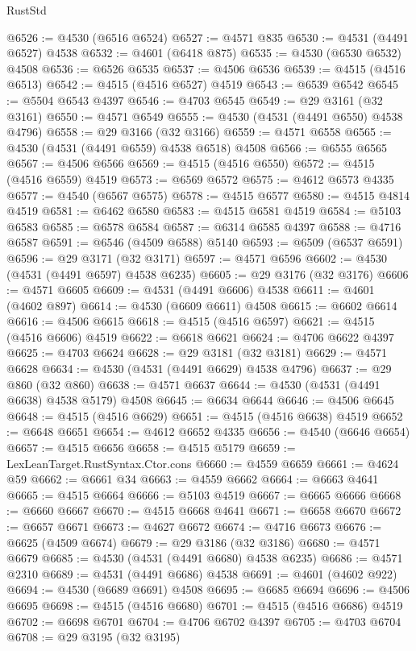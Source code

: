 \begin{lexlean}{RustStd}
\begin{coremodule}
@6526 := @4530 (@6516 @6524)
@6527 := @4571 @835
@6530 := @4531 (@4491 @6527) @4538
@6532 := @4601 (@6418 @875)
@6535 := @4530 (@6530 @6532) @4508
@6536 := @6526 @6535
@6537 := @4506 @6536
@6539 := @4515 (@4516 @6513)
@6542 := @4515 (@4516 @6527) @4519
@6543 := @6539 @6542
@6545 := @5504 @6543 @4397
@6546 := @4703 @6545
@6549 := @29 @3161 (@32 @3161)
@6550 := @4571 @6549
@6555 := @4530 (@4531 (@4491 @6550) @4538 @4796)
@6558 := @29 @3166 (@32 @3166)
@6559 := @4571 @6558
@6565 := @4530 (@4531 (@4491 @6559) @4538 @6518) @4508
@6566 := @6555 @6565
@6567 := @4506 @6566
@6569 := @4515 (@4516 @6550)
@6572 := @4515 (@4516 @6559) @4519
@6573 := @6569 @6572
@6575 := @4612 @6573 @4335
@6577 := @4540 (@6567 @6575)
@6578 := @4515 @6577
@6580 := @4515 @4814 @4519
@6581 := @6462 @6580
@6583 := @4515 @6581 @4519
@6584 := @5103 @6583
@6585 := @6578 @6584
@6587 := @6314 @6585 @4397
@6588 := @4716 @6587
@6591 := @6546 (@4509 @6588) @5140
@6593 := @6509 (@6537 @6591)
@6596 := @29 @3171 (@32 @3171)
@6597 := @4571 @6596
@6602 := @4530 (@4531 (@4491 @6597) @4538 @6235)
@6605 := @29 @3176 (@32 @3176)
@6606 := @4571 @6605
@6609 := @4531 (@4491 @6606) @4538
@6611 := @4601 (@4602 @897)
@6614 := @4530 (@6609 @6611) @4508
@6615 := @6602 @6614
@6616 := @4506 @6615
@6618 := @4515 (@4516 @6597)
@6621 := @4515 (@4516 @6606) @4519
@6622 := @6618 @6621
@6624 := @4706 @6622 @4397
@6625 := @4703 @6624
@6628 := @29 @3181 (@32 @3181)
@6629 := @4571 @6628
@6634 := @4530 (@4531 (@4491 @6629) @4538 @4796)
@6637 := @29 @860 (@32 @860)
@6638 := @4571 @6637
@6644 := @4530 (@4531 (@4491 @6638) @4538 @5179) @4508
@6645 := @6634 @6644
@6646 := @4506 @6645
@6648 := @4515 (@4516 @6629)
@6651 := @4515 (@4516 @6638) @4519
@6652 := @6648 @6651
@6654 := @4612 @6652 @4335
@6656 := @4540 (@6646 @6654)
@6657 := @4515 @6656
@6658 := @4515 @5179
@6659 := LexLeanTarget.RustSyntax.Ctor.cons
@6660 := @4559 @6659
@6661 := @4624 @59
@6662 := @6661 @34
@6663 := @4559 @6662
@6664 := @6663 @4641
@6665 := @4515 @6664
@6666 := @5103 @4519
@6667 := @6665 @6666
@6668 := @6660 @6667
@6670 := @4515 @6668 @4641
@6671 := @6658 @6670
@6672 := @6657 @6671
@6673 := @4627 @6672
@6674 := @4716 @6673
@6676 := @6625 (@4509 @6674)
@6679 := @29 @3186 (@32 @3186)
@6680 := @4571 @6679
@6685 := @4530 (@4531 (@4491 @6680) @4538 @6235)
@6686 := @4571 @2310
@6689 := @4531 (@4491 @6686) @4538
@6691 := @4601 (@4602 @922)
@6694 := @4530 (@6689 @6691) @4508
@6695 := @6685 @6694
@6696 := @4506 @6695
@6698 := @4515 (@4516 @6680)
@6701 := @4515 (@4516 @6686) @4519
@6702 := @6698 @6701
@6704 := @4706 @6702 @4397
@6705 := @4703 @6704
@6708 := @29 @3195 (@32 @3195)

\end{coremodule}
\end{lexlean}

